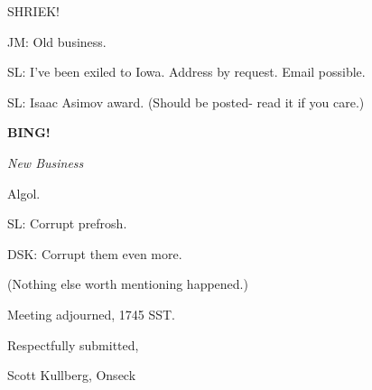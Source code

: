 \documentclass[12pt]{article}
\newcommand{\bing}{{\bf BING!} }
\newcommand{\goto}[1]{\bing \vskip 12pt \centerline{{\em{#1}}}}
\begin{document}
SHRIEK!

JM: Old business.

SL: I've been exiled to Iowa. Address by request. Email possible.

SL: Isaac Asimov award. (Should be posted- read it if you care.)

\goto{New Business}

Algol.

SL: Corrupt prefrosh.

DSK: Corrupt them even more.

(Nothing else worth mentioning happened.)

\vspace{12pt}

\noindent
Meeting adjourned, 1745 SST.

\vspace{18pt}

\centerline{Respectfully submitted,}
\centerline{Scott Kullberg, Onseck}
\end{document}
